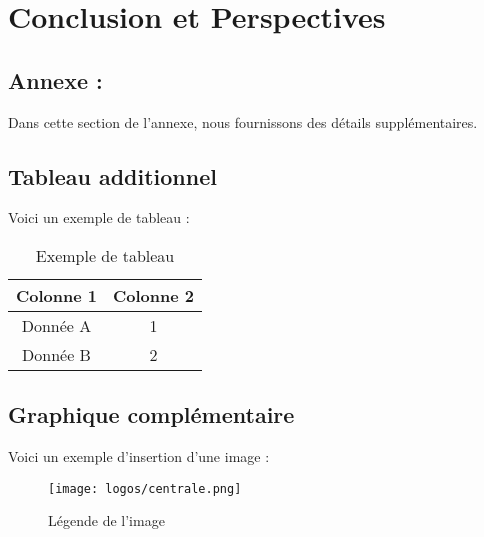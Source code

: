 \documentclass{rapportECC}
\begin{document}













\section{Conclusion et Perspectives}


\newpage


\printbibliography

\newpage
\begin{appendices}
\section{Annexe : }
Dans cette section de l'annexe, nous fournissons des détails supplémentaires.

\subsection{Tableau additionnel}
Voici un exemple de tableau :
\begin{table}[h]
    \centering
    \begin{tabular}{|c|c|}
    \hline
    Colonne 1 & Colonne 2 \\
    \hline
    Donnée A & 1 \\
    Donnée B & 2 \\
    \hline
    \end{tabular}
    \caption{Exemple de tableau}
\end{table}

\subsection{Graphique complémentaire}
Voici un exemple d'insertion d'une image :
\begin{figure}[h]
    \centering
    \texttt{[image: logos/centrale.png]}
    \caption{Légende de l'image}
\end{figure}
\end{appendices}
\end{document}
